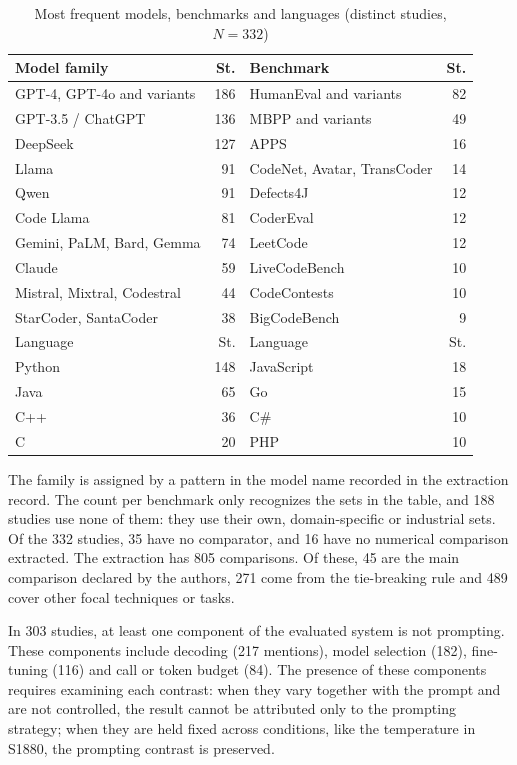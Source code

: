 \begin{table}[!t]
\caption{Most frequent models, benchmarks and languages (distinct studies, $N = 332$)}\label{tab:corpus}
\centering\footnotesize
\begin{tabular}{@{}lr@{\hspace{10pt}}lr@{}}
\hline
Model family & St. & Benchmark & St.\\
\hline
GPT-4, GPT-4o and variants & 186 & HumanEval and variants & 82\\
GPT-3.5 / ChatGPT & 136 & MBPP and variants & 49\\
DeepSeek & 127 & APPS & 16\\
Llama & 91 & CodeNet, Avatar, TransCoder & 14\\
Qwen & 91 & Defects4J & 12\\
Code Llama & 81 & CoderEval & 12\\
Gemini, PaLM, Bard, Gemma & 74 & LeetCode & 12\\
Claude & 59 & LiveCodeBench & 10\\
Mistral, Mixtral, Codestral & 44 & CodeContests & 10\\
StarCoder, SantaCoder & 38 & BigCodeBench & 9\\
\hline
Language & St. & Language & St.\\
\hline
Python & 148 & JavaScript & 18\\
Java & 65 & Go & 15\\
C++ & 36 & C\# & 10\\
C & 20 & PHP & 10\\
\hline
\end{tabular}
\end{table}

The family is assigned by a pattern in the model name recorded in the extraction record. The count per benchmark only
recognizes the sets in the table, and 188 studies use none of them: they use their own, domain-specific or
industrial sets. Of the 332 studies, 35 have no comparator, and 16 have no numerical comparison extracted. The
extraction has 805 comparisons. Of these, 45 are the main comparison declared by the authors, 271 come from the tie-breaking
rule and 489 cover other focal techniques or tasks.

In 303 studies, at least one component of the evaluated system is not prompting. These components include decoding
(217 mentions), model selection (182), fine-tuning (116) and call or token budget (84). The presence of these components requires examining
each contrast: when they vary together with the prompt and are not controlled, the result cannot be attributed only to the
prompting strategy; when they are held fixed across conditions, like the temperature in S1880, the prompting
contrast is preserved.

